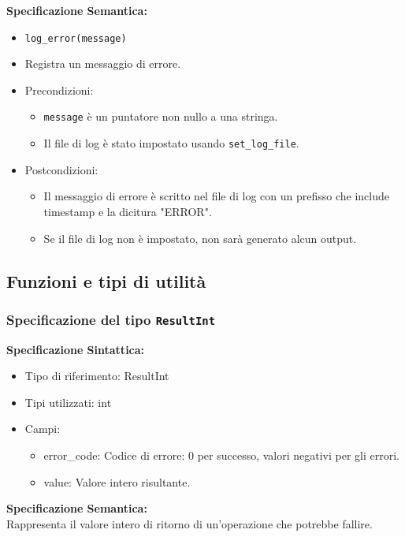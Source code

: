 \documentclass[11pt]{scrartcl} %
\begin{document}
\textbf{Specificazione Semantica:}
\begin{itemize}
	\item \texttt{log\_error(message)}
	\item Registra un messaggio di errore.
	\item Precondizioni:
	      \begin{itemize}
		      \item \texttt{message} è un puntatore non nullo a una stringa.
		      \item Il file di log è stato impostato usando \texttt{set\_log\_file}.
	      \end{itemize}
	\item Postcondizioni:
	      \begin{itemize}
		      \item Il messaggio di errore è scritto nel file di log con un prefisso che include timestamp e la dicitura "ERROR".
		      \item Se il file di log non è impostato, non sarà generato alcun output.
	      \end{itemize}
\end{itemize}

\subsection{Funzioni e tipi di utilità}

\subsubsection{Specificazione del tipo \texttt{ResultInt}}


\textbf{Specificazione Sintattica:}
\begin{itemize}
	\item Tipo di riferimento: ResultInt
	\item Tipi utilizzati: int
	\item Campi:
	      \begin{itemize}
		      \item error\_code: Codice di errore: 0 per successo, valori negativi per gli errori.
		      \item value: Valore intero risultante.
	      \end{itemize}
\end{itemize}



\textbf{Specificazione Semantica:} \\
Rappresenta il valore intero di ritorno di un'operazione che potrebbe fallire.
\end{document}
